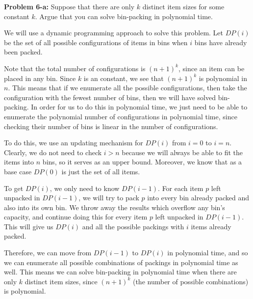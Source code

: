 \documentclass[psamsfonts]{amsart}
\newenvironment{sol}{\vspace{0.25cm}{\large \bfseries Solution:}}{\qedsymbol}
\newenvironment{prob}[1]{\begin{framed}{\large \bfseries Problem #1:}}{\end{framed}}
\begin{document}
\begin{prob}{6-a}
Suppose that there are only $k$ distinct item sizes for some constant $k$. Argue that you can solve bin-packing in polynomial time.
\end{prob}
\begin{sol}
We will use a dynamic programming approach to solve this problem. Let $DP(i)$ be the set of all possible configurations of items in bins when $i$ bins have already been packed. 

Note that the total number of configurations is $(n+1)^k$, since an item can be placed in any bin. Since $k$ is an constant, we see that $(n+1)^k$ is polynomial in $n$. This means that if we enumerate all the possible configurations, then take the configuration with the fewest number of bins, then we will have solved bin-packing. In order for us to do this in polynomial time, we just need to be able to enumerate the polynomial number of configurations in polynomial time, since checking their number of bins is linear in the number of configurations.

To do this, we use an updating mechanism for $DP(i)$ from $i=0$ to $i=n$. Clearly, we do not need to check $i > n$ because we will always be able to fit the items into $n$ bins, so it serves as an upper bound. Moreover, we know that as a base case $DP(0)$ is just the set of all items. 

To get $DP(i)$, we only need to know $DP(i-1)$. For each item $p$ left unpacked in $DP(i-1)$, we will try to pack $p$ into every bin already packed and also into its own bin. We throw away the results which overflow any bin's capacity, and continue doing this for every item $p$ left unpacked in $DP(i-1)$. This will give us $DP(i)$ and all the possible packings with $i$ items already packed.

Therefore, we can move from $DP(i-1)$ to $DP(i)$ in polynomial time, and so we can enumerate all possible combinations of packings in polynomial time as well. This means we can solve bin-packing in polynomial time when there are only $k$ distinct item sizes, since $(n+1)^k$ (the number of possible combinations) is polynomial.
\end{sol}
\end{document}
